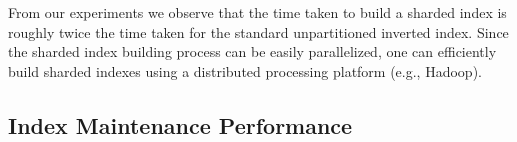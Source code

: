 
From our experiments we observe that the time taken to build
a sharded index is roughly twice the time taken for the standard
unpartitioned inverted index. Since the sharded index building process
can be easily parallelized, one can efficiently build sharded indexes
using a distributed processing platform (e.g., Hadoop).



\subsection{Index Maintenance Performance}

\begin{figure}[!htb]
  \centering {}
  \quad

\end{figure}
